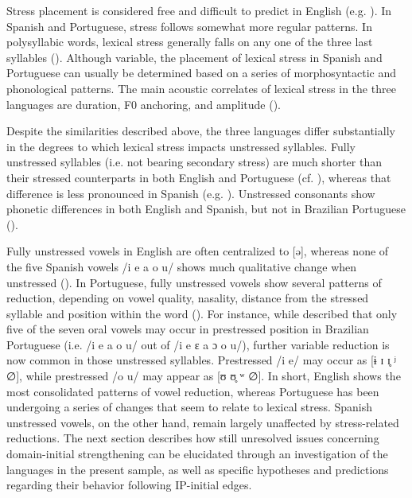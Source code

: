 \documentclass[output=paper]{langscibook}
\begin{document}
Stress placement is considered free and difficult to predict in English (e.g. \citealt{lp77}). In Spanish and Portuguese, stress follows somewhat more regular patterns. In polysyllabic words, lexical stress generally falls on any one of the three last syllables (\citealt{h12, md00}). Although variable, the placement of lexical stress in Spanish and Portuguese can usually be determined based on a series of morphosyntactic and phonological patterns. The main acoustic correlates of lexical stress in the three languages are duration, F0 anchoring, and amplitude (\citealt{b86, h12, md00}). 

Despite the similarities described above, the three languages differ substantially in the degrees to which lexical stress impacts unstressed syllables. Fully unstressed syllables (i.e. not bearing secondary stress) are much shorter than their stressed counterparts in both English and Portuguese (cf. \citealt{pks11, c13}), whereas that difference is less pronounced in Spanish (e.g. \citealt{op07}). Unstressed consonants show phonetic differences in both English and Spanish, but not in Brazilian Portuguese (\citealt{cssrc19}). 

\begin{sloppypar}
Fully unstressed vowels in English are often centralized to [ə], whereas none of the five Spanish vowels /i e a o u/ shows much qualitative change when unstressed (\citealt{n14}). In Portuguese, fully unstressed vowels show several patterns of reduction, depending on vowel quality, nasality, distance from the stressed syllable and position within the word (\citealt{c01, md00, cssrc19}). For instance, while \citet{c72} described that only five of the seven oral vowels may occur in prestressed position in Brazilian Portuguese (i.e. /i e a o u/ out of /i e ɛ a ɔ o u/), further variable reduction is now common in those unstressed syllables. Prestressed /i e/ may occur as [ɨ ɪ ɪ̥ ʲ ∅], while prestressed /o u/ may appear as [ʊ ʊ̥ ʷ ∅]. In short, English shows the most consolidated patterns of vowel reduction, whereas Portuguese has been undergoing a series of changes that seem to relate to lexical stress. Spanish unstressed vowels, on the other hand, remain largely unaffected by stress-related reductions. The next section describes how still unresolved issues concerning domain-initial strengthening can be elucidated through an investigation of the languages in the present sample, as well as specific hypotheses and predictions regarding their behavior following IP-initial edges. 
\end{sloppypar}
\end{document}
